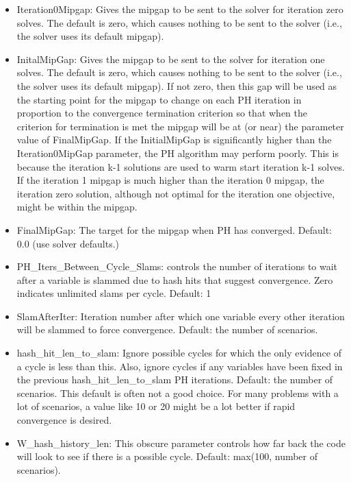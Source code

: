 \begin{itemize}
  \item Iteration0Mipgap: Gives the mipgap to be sent to the solver for
  iteration zero solves. The default is zero, which causes nothing to be sent to
  the solver (i.e., the solver uses its default mipgap).

  \item InitalMipGap: Gives the mipgap to be sent to the solver for iteration
  one solves. The default is zero, which causes nothing to be sent to the solver
  (i.e., the solver uses its default mipgap). If not zero, then this gap will be
  used as the starting point for the mipgap to change on each PH iteration in
  proportion to the convergence termination criterion so that when the criterion
  for termination is met the mipgap will be at (or near) the parameter value of
  FinalMipGap. If the InitialMipGap is significantly higher than the
  Iteration0MipGap parameter, the PH algorithm may perform poorly. This is
  because the iteration k-1 solutions are used to warm start iteration k-1
  solves. If the iteration 1 mipgap is much higher than the iteration 0 mipgap,
  the iteration zero solution, although not optimal for the iteration one
  objective, might be within the mipgap.

  \item FinalMipGap: The target for the mipgap when PH has converged. Default:
  0.0 (use solver defaults.)

  \item PH\_Iters\_Between\_Cycle\_Slams: controls the number of iterations to
  wait after a variable is slammed due to hash hits that suggest convergence.
  Zero indicates unlimited slams per cycle. Default: 1

  \item SlamAfterIter: Iteration number after which one variable every other
  iteration will be slammed to force convergence. Default: the number of
  scenarios.

  \item hash\_hit\_len\_to\_slam: Ignore possible cycles for which the only
  evidence of a cycle is less than this. Also, ignore cycles if any variables
  have been fixed in the previous hash\_hit\_len\_to\_slam PH iterations.
  Default: the number of scenarios. This default is often not a good choice. For
  many problems with a lot of scenarios, a value like 10 or 20 might be a lot
  better if rapid convergence is desired.

  \item W\_hash\_history\_len: This obscure parameter controls how far back the
  code will look to see if there is a possible cycle. Default: max(100, number
  of scenarios).
\end{itemize}

